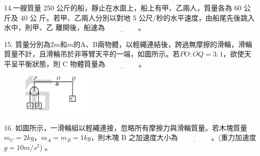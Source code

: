 \documentclass[cn,10pt,math=newtx,chinesefont=founder,device=ig]{elegantbook}
\begin{document}
\begin{example}
   14.一艘質量 250 公斤的船，靜止在水面上，船上有甲、乙兩人，質量各為 60 公斤及 40 公
斤。若甲、乙兩人分別以對地 5 $公尺/秒$的水平速度，由船尾先後跳入水中，則甲、乙
離開後，船速為$\underline{\hspace{2cm}}$。\\
    \rightline{[桃園聯招教甄109]}
\end{example}
\begin{solution}
    
\end{solution}

\newpage


\begin{example}
   15. 質量分別為2$m$和$m$的A、B兩物體，以輕繩連結後，跨過無摩擦的滑輪，滑輪質量不計，且滑輪吊於非等臂天平的一端，如圖所示。若$\overline{PO}: \overline{OQ}= 3: 1$，欲使天平呈平衡狀態，則 C 物體質量為$\underline{\hspace{2cm}}$。\\
    \rightline{[桃園聯招教甄109]}
\end{example}
\begin{solution}
    
\end{solution}
\begin{figure}[htbp]
    \flushright
    \includegraphics[width=0.3\textwidth]{image/109桃聯15.png}
  \end{figure}
\newpage


\begin{example}
   16. 如圖所示，一滑輪組以輕繩連接，忽略所有摩擦力與滑輪質量。若木塊質量$m_C = 2kg，m_A = m_B = 1kg$，則木塊 B 之加速度大小為$\underline{\hspace{2cm}}$。(重力加速度 $g=10 m/s^2$) 。\\
    \rightline{[桃園聯招教甄109]}
\end{example}
\begin{solution}
    
\end{solution}

\newpage
\end{document}
